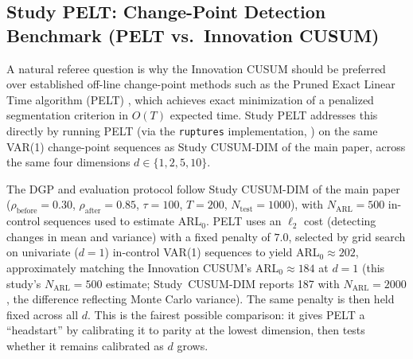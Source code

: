 \documentclass[bj,authoryear]{imsart}
\theoremstyle{plain}
\theoremstyle{definition}
\begin{document}
\subsection{Study PELT: Change-Point Detection Benchmark (PELT vs.\ Innovation CUSUM)}
\label{app:supp-pelt}

A natural referee question is why the Innovation CUSUM should be preferred over
established off-line change-point methods such as the Pruned Exact Linear
Time algorithm (PELT) \citep{killick2012optimal}, which achieves exact
minimization of a penalized segmentation criterion in $O(T)$ expected time.
Study PELT addresses this directly by running PELT (via the \texttt{ruptures}
implementation, \citealt{truong2020selective}) on the same VAR(1)
change-point sequences as Study CUSUM-DIM of the main paper, across the same four dimensions
$d \in \{1, 2, 5, 10\}$.

The DGP and evaluation protocol follow Study CUSUM-DIM of the main paper
($\rho_{\mathrm{before}}=0.30$, $\rho_{\mathrm{after}}=0.85$, $\tau=100$,
$T=200$, $N_{\mathrm{test}}=1000$), with $N_{\mathrm{ARL}}=500$
in-control sequences used to estimate ARL$_0$.
PELT uses an $\ell_2$ cost (detecting changes in mean and variance) with a fixed
penalty of $7.0$, selected by grid search on univariate ($d=1$) in-control
VAR(1) sequences to yield ARL$_0 \approx 202$, approximately matching the Innovation CUSUM's
ARL$_0 \approx 184$ at $d=1$ (this study's $N_{\mathrm{ARL}}=500$ estimate; Study~CUSUM-DIM reports 187 with $N_{\mathrm{ARL}}=2000$, the difference reflecting Monte Carlo variance).  The same penalty is then held fixed across all $d$.
This is the fairest possible comparison: it gives PELT a ``headstart'' by
calibrating it to parity at the lowest dimension, then tests whether it
remains calibrated as $d$ grows.
\end{document}
